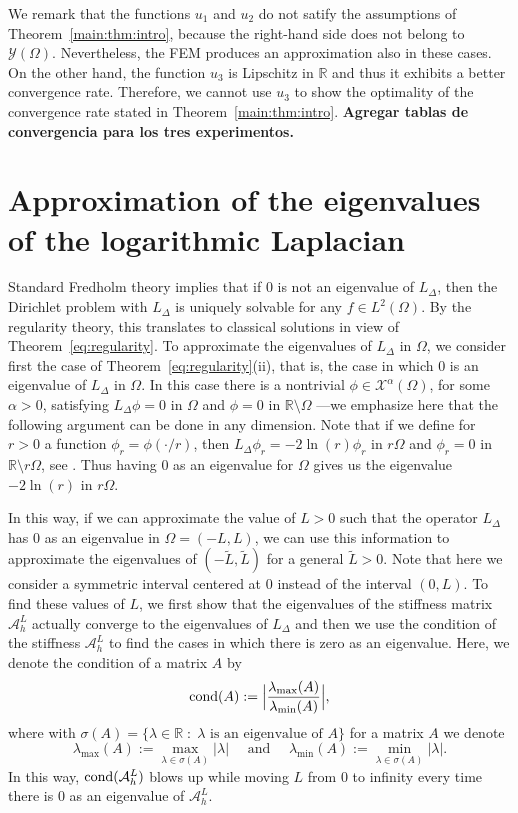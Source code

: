 \documentclass[10 pt]{article}
\numberwithin{equation}{section}
\def\tilde{\widetilde}
\def\R{\mathbb{R}}
\newcommand{\Bc}[1]{{\color{red}\textbf{#1}}}  %
\begin{document}
We remark that the functions $u_1$ and $u_2$ do not satify the assumptions of Theorem~\ref{main:thm:intro}, because the right-hand side does not belong to $\mathcal Y(\Omega)$. Nevertheless, the FEM produces an approximation also in these cases.  On the other hand, the function $u_3$ is Lipschitz in $\R$ and thus it exhibits a better convergence rate. Therefore, we cannot use $u_3$ to show the optimality of the convergence rate stated in Theorem~\ref{main:thm:intro}. \Bc{Agregar tablas de convergencia para los tres experimentos.}


\section{Approximation of the eigenvalues of the logarithmic Laplacian}\label{eigenvalue approximation:sec}

Standard Fredholm theory implies that if $0$ is not an eigenvalue of $L_\Delta$, then the Dirichlet problem with $L_{\Delta}$ is uniquely solvable for any $f\in L^2(\Omega)$. By the regularity theory, this translates to classical solutions in view of  Theorem~\ref{eq:regularity}. To approximate the eigenvalues of $L_{\Delta}$ in $\Omega$, we consider first the case of Theorem~\ref{eq:regularity}(ii), that is, the case in which $0$ is an eigenvalue of $L_{\Delta}$ in $\Omega$. In this case there is a nontrivial $\phi\in \mathcal X^{\alpha}(\Omega)$, for some $\alpha>0$, satisfying $L_{\Delta}\phi=0$ in  $\Omega$ and $\phi=0$ in $\R\setminus \Omega$ ---we emphasize here that the following argument can be done in any dimension. Note that if we define for $r>0$ a function $\phi_r=\phi(\cdot/r)$, then $L_{\Delta}\phi_r=-2\ln(r)\phi_r$ in $r\Omega$ and $\phi_r=0$ in $\R\setminus r\Omega$, see \cite[Lemma 2.5]{LW21}. Thus having $0$ as an eigenvalue for $\Omega$ gives us the eigenvalue $-2\ln(r)$ in $r\Omega$.

In this way, if we can approximate the value of $L>0$ such that the operator $L_{\Delta}$ has $0$ as an eigenvalue in $\Omega=(-L,L)$, we can use this information to approximate the eigenvalues of $(-\tilde{L},\tilde{L})$ for a general $\tilde{L}>0$. Note that here we consider a symmetric interval centered at $0$ instead of the interval $(0,L)$. To find these values of $L$, we first show that the eigenvalues of the stiffness matrix $\mathcal A_h^L$ actually converge to the eigenvalues of $L_{\Delta}$ and then we use the condition of the stiffness $\mathcal{A}^L_h$ to find the cases in which there is zero as an eigenvalue. Here, we denote the condition of a matrix $A$ by
\begin{equation}\label{defi:condition}
\textnormal{cond}(A):=\Big|\frac{\lambda_{\max}(A)}{\lambda_{\min}(A)}\Big|,
\end{equation}
where with $\sigma(A)=\{\lambda\in \R\;:\; \lambda\text{ is an eigenvalue of $A$}\}$ for a matrix $A$ we denote
$$
\lambda_{\max}(A):=\max_{\lambda\in \sigma(A)}|\lambda|\quad\text{ and }\quad \lambda_{\min}(A):=\min_{\lambda\in \sigma(A)}|\lambda|.
$$
In this way, $\textnormal{cond}(\mathcal{A}^L_h)$ blows up while moving $L$ from $0$ to infinity every time there is $0$ as an eigenvalue of $\mathcal{A}^L_h$.
\end{document}
